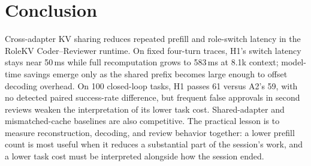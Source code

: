 \documentclass[10pt,twocolumn,letterpaper]{article}
\begin{document}
\section{Conclusion}
Cross-adapter KV sharing reduces repeated prefill and role-switch latency
in the RoleKV Coder--Reviewer runtime. On fixed four-turn traces, H1's switch
latency stays near 50\,ms while full recomputation grows to 583\,ms at
8.1k context; model-time savings emerge only as the shared prefix becomes
large enough to offset decoding overhead. On 100 closed-loop tasks, H1
passes 61 versus A2's 59, with no detected paired success-rate difference,
but frequent false approvals in second reviews weaken the interpretation
of its lower task cost. Shared-adapter and mismatched-cache baselines are
also competitive. The practical lesson is to measure reconstruction,
decoding, and review behavior together: a lower prefill count is most useful
when it reduces a substantial part of the session's work, and a lower
task cost must be interpreted alongside how the session ended.

\clearpage

\begingroup
\raggedright
{}

\endgroup
\end{document}
